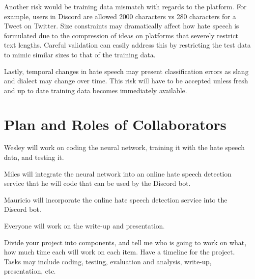 \documentclass[conference]{sig-alternate-05-2015}
\begin{document}
Another risk would be training data mismatch with regards to the platform.  For example, users in Discord are allowed 2000 characters vs 280 characters for a Tweet on Twitter.  Size constraints may dramatically affect how hate speech is formulated due to the compression of ideas on platforms that severely restrict text lengths.  Careful validation can easily address this by restricting the test data to mimic similar sizes to that of the training data.

Lastly, temporal changes in hate speech may present classification errors as slang and dialect may change over time.  This risk will have to be accepted unless fresh and up to date training data becomes immediately available.
\color{black}

\section{Plan and Roles of Collaborators}

Wesley will work on coding the neural network, training it with the hate speech data, and testing it.

Miles will integrate the neural network into an online hate speech detection service that he will code that can be used by the Discord bot. 

Mauricio will incorporate the online hate speech detection service into the Discord bot.

Everyone will work on the write-up and presentation.



\color{red}Divide your project into components, and tell me who is going to work on what, how much time each will work on each item. Have a timeline for the project. Tasks may include coding, testing, evaluation and analysis, write-up, presentation, etc.
\color{black}



\end{document}
